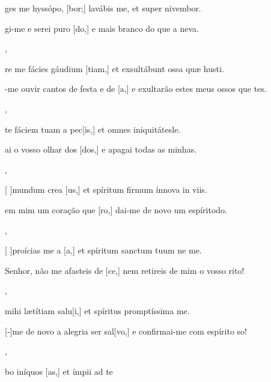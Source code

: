 {  {\item {}ges me hyssópo, [bor;] lavábis me, et super nivembor.~\Antiphona}%
    {\item {}gi-me e serei puro [do,] e mais branco do que a neva.~\Antiphona},
  {\item {}re me fácies gáudium [tiam,] et exsultábunt ossa quæ husti.~\Antiphona}%
    {\item {}-me ouvir cantos de festa e de [a,] e exultarão estes meus ossos que tes.~\Antiphona},
  {\item {}te fáciem tuam a pec[is,] et omnes iniquitátesle.~\Antiphona}%
    {\item {}ai o vosso olhar dos [dos,] e apagai todas as minhas.~\Antiphona},
  {\item {}[ ]{mun}dum crea [us,] et spíritum firmum ínnova in viis.~\Antiphona}%
    {\item {} em mim um coração que [ro,] dai-me de novo um espíritodo.~\Antiphona},
  {\item {}[ ]{pro}ícias me a [a,] et spíritum sanctum tuum ne  me.~\Antiphona}%
    {\item {} {Se}nhor, não me afasteis de [ce,] nem retireis de mim o vosso rito!~\Antiphona},
  {\item {} mihi lætítiam salu[i,] et spíritus promptíssima me.~\Antiphona}%
    {\item {}[-]{me} de novo a alegria  {ser }{sal}[vo,] e confir\-mai-me com espírito so!~\Antiphona},
  {\item {}bo iníquos [as,] et ímpii ad te ~\Antiphona}%
}
